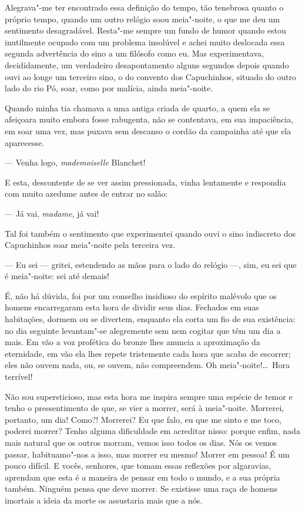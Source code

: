  Alegrava"-me ter encontrado essa definição do tempo, tão tenebrosa
quanto o próprio tempo, quando um outro relógio soou meia"-noite, o que
me deu um sentimento desagradável. Resta"-me sempre um fundo de humor
quando estou inutilmente ocupado com um problema insolúvel e achei
muito deslocada essa segunda advertência do sino a um filósofo como eu.
Mas experimentava, decididamente, um verdadeiro desapontamento alguns
segundos depois quando ouvi ao longe um terceiro sino, o do convento
dos Capuchinhos, situado do outro lado do rio Pó, soar, como por
malícia, ainda meia"-noite. 

 Quando minha tia chamava a uma antiga criada de quarto, a quem ela se
afeiçoara muito embora fosse rabugenta, não se contentava, em sua
impaciência, em soar uma vez, mas puxava sem descanso o cordão da
campainha até que ela aparecesse. 

--- Venha logo, \textit{mademoiselle} Blanchet! 

E esta, descontente de se ver assim pressionada, vinha lentamente e
respondia com muito azedume antes de entrar no salão:  

--- Já vai, \textit{madame}, já vai! 

Tal foi também o sentimento que experimentei quando ouvi o sino
indiscreto dos Capuchinhos soar meia"-noite pela terceira vez. 

--- Eu sei --- gritei, estendendo as mãos para o lado do relógio ---, sim, eu
sei que é meia"-noite: sei até demais!

É, não há dúvida, foi por um conselho insidioso do espírito
malévolo que os homens encarregaram esta hora de dividir seus dias.
Fechados em suas habitações, dormem ou se divertem, enquanto ela corta
um fio de sua existência: no dia seguinte levantam"-se alegremente sem
nem cogitar que têm um dia a mais. Em vão a voz profética do bronze                           
lhes anuncia a aproximação da eternidade, em vão ela lhes repete
tristemente cada hora que acaba de escorrer; eles não ouvem nada, ou,
se ouvem, não compreendem. Oh meia"-noite!\ldots\ Hora terrível! 

Não sou supersticioso, mas esta hora me inspira sempre uma espécie de
temor e tenho o pressentimento de que, se vier a morrer, será à
meia"-noite. Morrerei, portanto, um dia! Como?! Morrerei? Eu que falo, eu
que me sinto e me toco, poderei morrer? Tenho alguma dificuldade em
acreditar nisso: porque enfim, nada mais natural que os outros morram,
vemos isso todos os dias. Nós os vemos passar, habituamo"-nos a isso,
mas morrer eu mesmo! Morrer em pessoa! É um pouco difícil. E vocês,
senhores, que tomam essas reflexões por algaravias, aprendam que esta é
a maneira de pensar em todo o mundo, e a sua própria também. Ninguém
pensa que deve morrer. Se existisse uma raça de homens imortais a ideia
da morte os assustaria mais que a nós.

